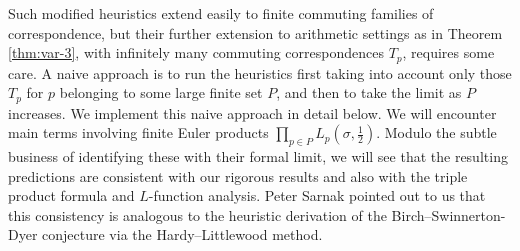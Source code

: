 \documentclass[reqno,10pt]{amsart}
\theoremstyle{plain} %
\theoremstyle{definition}
\theoremstyle{plain} %
\theoremstyle{remark}
\theoremstyle{itplain} %
\theoremstyle{remark} %
\numberwithin{equation}{section}
\begin{document}
Such modified heuristics extend easily to finite commuting families of correspondence, but their further extension to arithmetic settings as in Theorem \ref{thm:var-3}, with infinitely many commuting correspondences $T_p$, requires some care.  A naive approach is to run the heuristics first taking into account only those $T_p$ for $p$ belonging to some large finite set $P$, and then to take the limit as $P$ increases.  We implement this naive approach in detail below.  We will encounter main terms involving finite Euler products $\prod_{p \in P} L_p(\sigma,\tfrac{1}{2} )$.  Modulo the subtle business of identifying these with their formal limit, we will see that the resulting predictions are consistent with our rigorous results and also with the triple product formula and $L$-function analysis.    Peter Sarnak pointed out to us that this consistency is analogous to the heuristic derivation of the Birch--Swinnerton-Dyer conjecture via the Hardy--Littlewood method.
\end{document}
